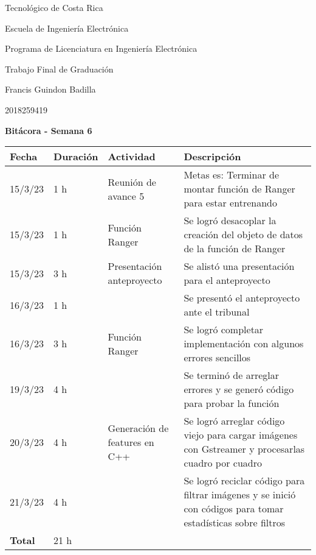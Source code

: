 \documentclass[12pt,oneside]{book}
\begin{document}
 \graphicspath{{./}{../tesis/fig/}}
  Tecnológico de Costa Rica
  \par\vspace{1mm}
  Escuela de Ingeniería Electrónica
  \par\vspace{1mm}
  Programa de Licenciatura en Ingeniería Electrónica
  \par\vspace{10mm}
  Trabajo Final de Graduación
  \par\vspace{1mm}
  Francis Guindon Badilla
  \par\vspace{1mm}
  2018259419
  \par\vspace{10mm}
  \large\textbf{Bitácora - Semana 6}
  \par\vspace{10mm}
  \small

  \begin{table} [!h]
    \centering
    \small
    \begin{tabular}{p{1.5 cm} p{2.1 cm} p{5 cm} p{8 cm}}
      \hline
      Fecha & Duración & Actividad & Descripción \\
      \hline
      15/3/23 & 1 h & Reunión de avance 5 & Metas es: Terminar de montar función de Ranger para estar entrenando \\
      15/3/23 & 1 h & Función Ranger & Se logró desacoplar la creación del objeto de datos de la función de Ranger \\ 
      15/3/23 & 3 h & Presentación anteproyecto & Se alistó una presentación para el anteproyecto \\
      16/3/23 & 1 h & & Se presentó el anteproyecto ante el tribunal \\
      16/3/23 & 3 h & Función Ranger & Se logró completar implementación con algunos errores sencillos \\
      19/3/23 & 4 h & & Se terminó de arreglar errores y se generó código para probar la función \\
      20/3/23 & 4 h & Generación de features en C++ & Se logró arreglar código viejo para cargar imágenes con Gstreamer y procesarlas cuadro por cuadro \\
      21/3/23 & 4 h & & Se logró reciclar código para filtrar imágenes y se inició con códigos para tomar estadísticas sobre filtros \\
      \hline
      \textbf{Total} & 21 h \\
      \hline
    \end{tabular}
  \end{table}
  
\end{document}
